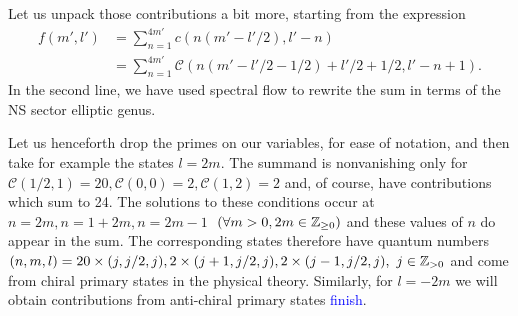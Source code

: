 \documentclass[../main.tex]{subfiles}
\begin{document}

Let us unpack those contributions a bit more, starting from the expression 
\begin{align}\label{eq:fml2}
f(m', l') &= \sum_{n=1}^{4m'}c(n(m'-l'/2), l'-n) \\
&= \sum_{n=1}^{4m'}\mathcal{C}(n(m'-l'/2 - 1/2) + l'/2 + 1/2, l' - n +1).
\end{align} In the second line, we have used spectral flow to rewrite the sum in terms of the NS sector elliptic genus.


Let us henceforth drop the primes on our variables, for ease of notation, and then take for example the states $l = 2 m$. The summand is nonvanishing only for $\mathcal{C}(1/2, 1)= 20, \mathcal{C}(0, 0)=2, \mathcal{C}(1, 2)= 2$ and, of course, have contributions which sum to 24. The solutions to these conditions occur at $n=2m, n = 1 + 2m, n=2m -1$ $ \ (\forall m >0, 2m \in \mathbb Z_{\geq 0})$ and these values of $n$ do appear in the sum. The corresponding states therefore have quantum numbers $(n, m, l) = 20\times(j, j/2, j), 2\times(j + 1, j/2, j), 2\times(j-1, j/2, j), \ j \in \mathbb Z_{>0}$ and come from chiral primary states in the physical theory. Similarly, for $l = -2m$ we will obtain contributions from anti-chiral primary states \textcolor{blue}{finish}. 
\end{document}
